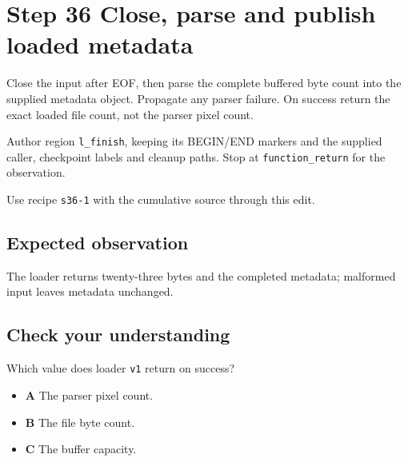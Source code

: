 \section{Step 36 Close, parse and publish loaded metadata}\label{ppm-s36}

Close the input after EOF, then parse the complete buffered byte count into the supplied metadata object. Propagate any parser failure. On success return the exact loaded file count, not the parser pixel count.

Author region \texttt{l\_finish}, keeping its BEGIN/END markers and the supplied caller, checkpoint labels and cleanup paths. Stop at \texttt{function\_return} for the observation.

Use recipe \texttt{s36-1} with the cumulative source through this edit.

\subsection{Expected observation}
The loader returns twenty-three bytes and the completed metadata; malformed input leaves metadata unchanged.

\subsection{Check your understanding}
Which value does loader \texttt{v1} return on success?

\begin{itemize}
  \item \textbf{A} The parser pixel count.
  \item \textbf{B} The file byte count.
  \item \textbf{C} The buffer capacity.
\end{itemize}
